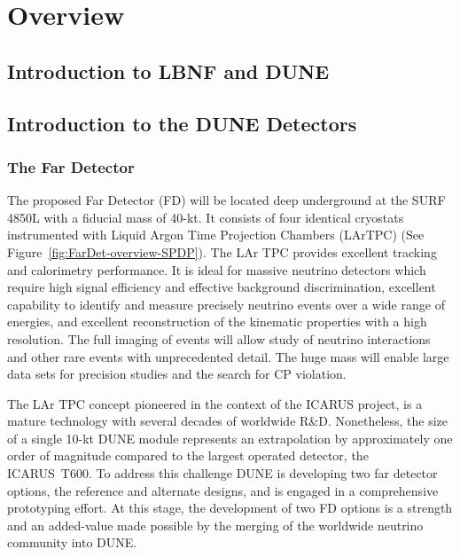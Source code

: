 \chapter{Overview}
\label{ch:detectors-overview}

\section{Introduction to LBNF and DUNE}


\section{Introduction to the DUNE Detectors}
\label{sec:intro-dune-det}

\subsection{The Far Detector}
\label{sec:intro-dune-far-det}

The proposed Far Detector (FD) will be located deep underground at the
SURF 4850L with a fiducial mass of 40-kt. It consists of four
identical cryostats instrumented with Liquid Argon Time Projection
Chambers (LArTPC) (See Figure~\ref{fig:FarDet-overview-SPDP}). The LAr
TPC provides excellent tracking and calorimetry performance. It is
ideal for massive neutrino detectors which require high signal
efficiency and effective background discrimination, excellent
capability to identify and measure precisely neutrino events over a
wide range of energies, and excellent reconstruction of the kinematic
properties with a high resolution. The full imaging of events will
allow study of neutrino interactions and other rare events with
unprecedented detail. The huge mass will enable large data sets for
precision studies and the search for CP violation.

The LAr TPC concept pioneered in the context of the ICARUS project, is
a mature technology with several decades of worldwide R\&D.
Nonetheless, the size of a single 10-kt DUNE module represents an
extrapolation by approximately one order of magnitude compared to the
largest operated detector, the ICARUS~T600. To address this challenge
DUNE is developing two far detector options, the reference and
alternate designs, and is engaged in a comprehensive prototyping
effort. At this stage, the development of two FD options is a strength
and an added-value made possible by the merging of the worldwide
neutrino community into DUNE.

